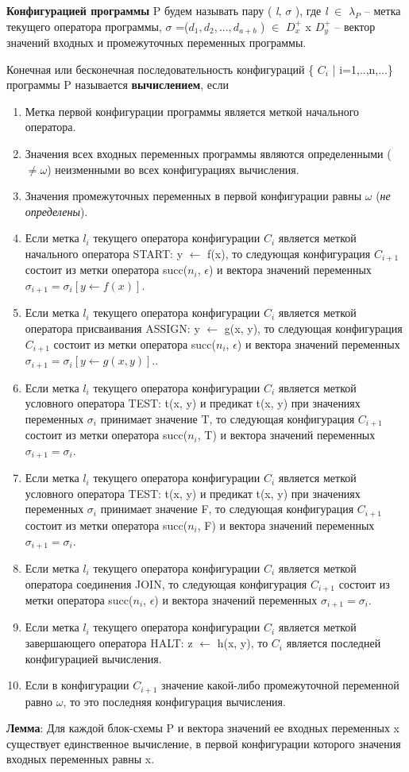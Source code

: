 \textbf{Конфигурацией программы} P будем называть пару ( \textit{l}, $\sigma$ ), где \textit{l} $\in$ $\lambda_P$ – метка текущего оператора программы, $\sigma$ =($d_1,d_2,...,d_{a+b}$ ) $\in$ $D_x^+$ x $D_y^+$ – вектор значений входных и промежуточных переменных программы.


Конечная или бесконечная последовательность конфигураций \{ $C_i$ | i=1,..,n,...\} программы P называется \textbf{вычислением}, если

\begin{enumerate}
    \item Метка первой конфигурации программы является меткой начального оператора.
    \item Значения всех входных переменных программы являются определенными ($\neq \omega$)  неизменными во всех конфигурациях вычисления.
    \item Значения промежуточных переменных в первой конфигурации равны $\omega$ (\textit{не определены}).
    \item Если метка $\textit{l}_i$ текущего оператора конфигурации $C_i$ является меткой начального оператора START: y $\leftarrow$ f(x), то следующая конфигурация $C_{i+1}$ состоит из метки оператора succ($n_i$, $\epsilon$) и вектора значений переменных $\sigma_{i+1} = \sigma_i[y \leftarrow f(x)]$.
    \item Если метка $\textit{l}_i$ текущего оператора конфигурации $C_i$ является меткой оператора присваивания ASSIGN: y $\leftarrow$ g(x, y), то следующая конфигурация $C_{i+1}$ состоит из метки оператора succ($n_i$, $\epsilon$) и вектора значений переменных $\sigma_{i+1} = \sigma_i[y \leftarrow g(x, y)]$..
    \item Если метка $\textit{l}_i$ текущего оператора конфигурации $C_i$ является меткой условного оператора TEST: t(x, y) и предикат t(x, y) при значениях переменных $\sigma_i$ принимает значение T, то следующая конфигурация $C_{i+1}$ состоит из метки оператора succ($n_i$, T) и вектора значений переменных $\sigma_{i+1} = \sigma_i$.
    \item Если метка $\textit{l}_i$ текущего оператора конфигурации $C_i$ является меткой условного оператора TEST: t(x, y) и предикат t(x, y) при значениях переменных $\sigma_i$ принимает значение F, то следующая конфигурация $C_{i+1}$ состоит из метки оператора succ($n_i$, F) и вектора значений переменных $\sigma_{i+1} = \sigma_i$.
    \item Если метка $\textit{l}_i$ текущего оператора конфигурации $C_i$ является меткой оператора соединения JOIN, то следующая конфигурация $C_{i+1}$ состоит из метки оператора succ($n_i$, $\epsilon$) и вектора значений переменных $\sigma_{i+1} = \sigma_i$.
    \item Если метка $\textit{l}_i$ текущего оператора конфигурации $C_i$ является меткой завершающего оператора HALT: z $\leftarrow$ h(x, y), то $C_i$ является последней конфигурацией вычисления.
    \item Если в конфигурации $C_{i+1}$ значение какой-либо промежуточной переменной равно $\omega$, то это последняя конфигурация вычисления.
\end{enumerate}

\textbf{Лемма}: Для каждой блок-схемы P и вектора значений ее входных переменных x существует единственное вычисление, в первой конфигурации которого значения входных переменных равны x.

